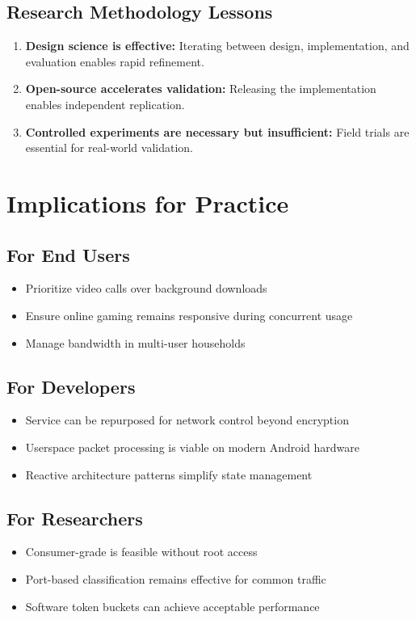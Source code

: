 \subsection{Research Methodology Lessons}

\begin{enumerate}
    \item \textbf{Design science is effective:} Iterating between design, implementation, and evaluation enables rapid refinement.
    
    \item \textbf{Open-source accelerates validation:} Releasing the implementation enables independent replication.
    
    \item \textbf{Controlled experiments are necessary but insufficient:} Field trials are essential for real-world validation.
\end{enumerate}

\section{Implications for Practice}

\subsection{For End Users}

\begin{itemize}
    \item Prioritize video calls over background downloads
    \item Ensure online gaming remains responsive during concurrent usage
    \item Manage bandwidth in multi-user households
\end{itemize}

\subsection{For Developers}

\begin{itemize}
    \item \vpn Service can be repurposed for network control beyond encryption
    \item Userspace packet processing is viable on modern Android hardware
    \item Reactive architecture patterns simplify state management
\end{itemize}

\subsection{For Researchers}

\begin{itemize}
    \item Consumer-grade \qos is feasible without root access
    \item Port-based classification remains effective for common traffic
    \item Software token buckets can achieve acceptable performance
\end{itemize}
